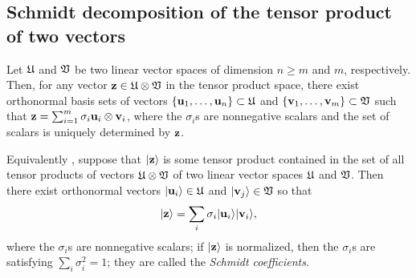\subsection{Schmidt decomposition of the tensor product of two vectors}
\label{2011-m-Schmidtdecomposition}

Let  ${\frak U}$  and   ${\frak V}$ be
two linear vector spaces
of dimension $n\ge m$ and $m$, respectively.
Then, for any vector
${\bf z} \in {\frak U}\otimes {\frak V}$
in the tensor product space,
there exist
orthonormal basis sets of vectors
$\{ {\bf u}_1, \ldots ,{\bf u}_n \}  \subset  {\frak U}$
and
$\{ {\bf v}_1, \ldots ,{\bf v}_m \}  \subset  {\frak V}$
such that
${\bf z}=\sum_{i=1}^m
\sigma_i  {\bf u}_i \otimes  {\bf v}_i$,
where the $\sigma_i$s are nonnegative scalars and the set of scalars is uniquely determined by
${\bf z}$.

Equivalently \cite{nielsen-book}, suppose that
$\vert {\bf z}\rangle $
 is some tensor product  contained in   the set of all tensor products of vectors
$ {\frak U}\otimes {\frak V}$ of     two linear vector spaces
 ${\frak U}$  and   ${\frak V}$.
Then there exist orthonormal vectors
$ \vert {\bf u}_i  \rangle \in  {\frak U}$
and
$ \vert {\bf v}_j  \rangle \in  {\frak V}$
so that
\begin{equation}
  \vert {\bf z}\rangle = \sum_i \sigma_i   \vert {\bf u}_i  \rangle  \vert {\bf v}_i  \rangle ,
\label{2011-e-sd}
\end{equation}
where the  $\sigma_i$s are nonnegative scalars; if $  \vert {\bf z}\rangle$
is normalized, then the  $\sigma_i$s are  satisfying
$\sum_i \sigma_i^2=1$;
they are called the
{\em Schmidt coefficients}.

